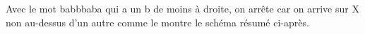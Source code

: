 \phantom{\emptybox\emptybox\emptybox\emptybox\emptybox\emptybox\emptybox\emptybox}%
	\deah

\emptybox\emptybox%
	\emptybox\emptybox\emptybox%
\emptybox\emptybox



\bigskip %

\phantom{\emptybox\emptybox\emptybox\emptybox\emptybox\emptybox\emptybox\emptybox\emptybox\emptybox\emptybox}%
	\deah

\nemptybox\nemptybox%
\nemptybox\nemptybox

\phantom{\emptybox}%
	\deah

\emptybox\emptybox%
	\emptybox\emptybox\emptybox%
\emptybox\emptybox

\phantom{\emptybox}%
	\deah

\emptybox\emptybox%
	\emptybox\emptybox\emptybox%
\emptybox\emptybox



\bigskip



Avec le mot babbbaba qui a un b de moins à droite, on arrête car on arrive sur X non au-dessus d'un autre comme le montre le schéma résumé ci-après.


\begin{multicols}{2}
\phantom{\emptybox\emptybox\emptybox\emptybox\emptybox\emptybox\emptybox\emptybox\emptybox\emptybox}%
	\deah

\nemptybox\nemptybox%
\nemptybox\nemptybox

\phantom{\emptybox\emptybox\emptybox\emptybox\emptybox\emptybox\emptybox\emptybox}%
	\deah

\emptybox\emptybox%
	\emptybox\emptybox%
\emptybox\emptybox

\phantom{\emptybox\emptybox\emptybox\emptybox\emptybox\emptybox\emptybox}%
	\deah

\emptybox\emptybox%
	\emptybox\emptybox\emptybox%
\emptybox\emptybox




\phantom{\emptybox\emptybox\emptybox\emptybox\emptybox\emptybox\emptybox\emptybox\emptybox\emptybox}%
	\deah

\nemptybox\nemptybox%
\nemptybox\nemptybox

\phantom{\emptybox\emptybox}%
	\deah

\emptybox\emptybox%
	\emptybox\emptybox%
\emptybox\emptybox

\phantom{\emptybox}%
	\deah

\emptybox\emptybox%
	\emptybox\emptybox\emptybox%
\emptybox\emptybox
\end{multicols}



